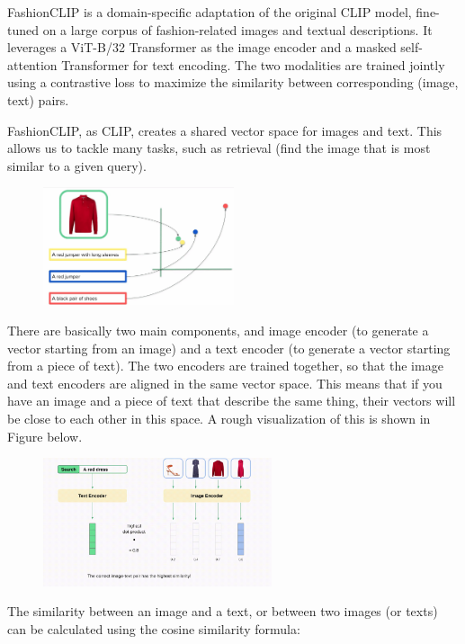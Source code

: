 FashionCLIP is a domain-specific adaptation of the original CLIP model, fine-tuned on a large corpus of fashion-related images and textual descriptions. It leverages a ViT-B/32 Transformer as the image encoder and a masked self-attention Transformer for text encoding. The two modalities are trained jointly using a contrastive loss to maximize the similarity between corresponding (image, text) pairs.

FashionCLIP, as CLIP, creates a shared vector space for images and text. This allows us to tackle many tasks, such as retrieval (find the image that is most similar to a given query).

\begin{figure}[H]
\centering
  \includegraphics[width=0.5\textwidth]{images/shared-vs.png}
\end{figure}


There are basically two main components, and image encoder (to generate a vector starting from an image) and a text encoder (to generate a vector starting from a piece of text). The two encoders are trained together, so that the image and text encoders are aligned in the same vector space. This means that if you have an image and a piece of text that describe the same thing, their vectors will be close to each other in this space. A rough visualization of this is shown in Figure below.

\begin{figure}[H]
  \centering
      \includegraphics[width=0.6\textwidth]{images/dotprod.png}
  \end{figure}

The similarity between an image and a text, or between two images (or texts) can be calculated using the cosine similarity formula:

